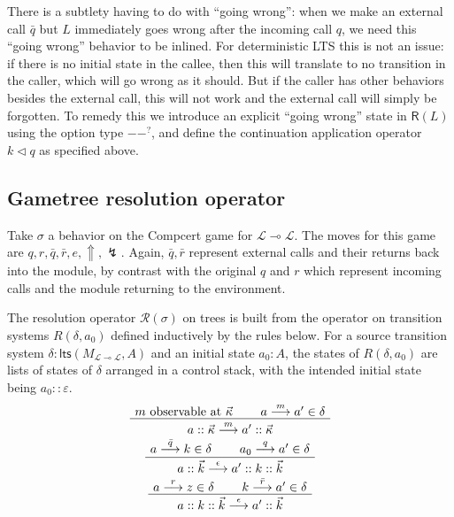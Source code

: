 \documentclass[11pt]{article}
\newcommand{\kw}[1]{{\mathsf{#1}}}
\begin{document}
There is a subtlety having to do with ``going wrong'':
when we make an external call $\bar{q}$
but $L$ immediately goes wrong after the incoming call $q$,
we need this ``going wrong'' behavior to be inlined.
For deterministic LTS this is not an issue:
if there is no initial state in the callee,
then this will translate to no transition in the caller,
which will go wrong as it should.
But if the caller has other behaviors
besides the external call,
this will not work and the external call will simply be
forgotten.
To remedy this we introduce an explicit ``going wrong''
state in $\kw{R}(L)$ using the option type $--^?$,
and define the continuation application operator $k \lhd q$
as specified above.

\subsection{Gametree resolution operator}
\label{sec:res}

Take $\sigma$ a behavior on the Compcert game for
$\mathcal{L} \multimap \mathcal{L}$.
The moves for this game are $q, r, \bar{q}, \bar{r}, e, \Uparrow, \lightning$.
Again, $\bar{q}, \bar{r}$ represent external calls and their returns
back into the module,
by contrast with the original $q$ and $r$ which represent
incoming calls and the module returning to the environment.

The resolution operator $\mathcal{R}(\sigma)$ on trees is built from
the operator on transition systems $R(\delta, a_0)$
defined inductively by the rules below.
For a source transition system
$\delta : \kw{lts}(M_{\mathcal{L} \multimap \mathcal{L}}, A)$
and an initial state $a_0 : A$,
the states of $R(\delta, a_0)$ are lists of states of $\delta$ arranged in a control stack,
with the intended initial state being $a_0 :: \varepsilon$.
\begin{gather*}
  \AxiomC{$m \mbox{ observable at } \vec{\kappa}$}
  \AxiomC{$a \stackrel{m}{\longrightarrow} a' \in \delta$}
  \BinaryInfC{$a :: \vec{\kappa} \stackrel{m}{\longrightarrow} a' :: \vec{\kappa}$}
  \DisplayProof \\
  \AxiomC{$a \stackrel{\bar{q}}{\longrightarrow} k \in \delta$}
  \AxiomC{$a_0 \stackrel{q}{\longrightarrow} a' \in \delta$}
  \BinaryInfC{$a :: \vec{k} \stackrel{\epsilon}{\longrightarrow} a' :: k :: \vec{k}$}
  \DisplayProof \\
  \AxiomC{$a \stackrel{r}{\longrightarrow} z \in \delta$}
  \AxiomC{$k \stackrel{\bar{r}}{\longrightarrow} a' \in \delta$}
  \BinaryInfC{$a :: k :: \vec{k} \stackrel{\epsilon}{\longrightarrow} a' :: \vec{k}$}
  \DisplayProof
\end{gather*}
\end{document}
